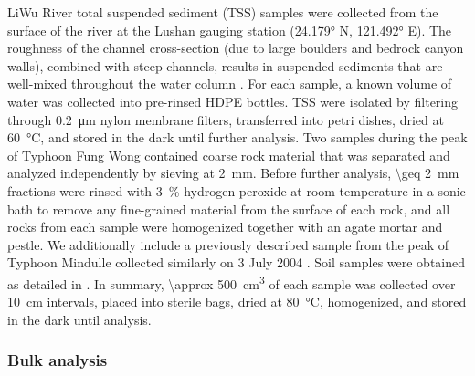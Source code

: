LiWu River total suspended sediment (TSS) samples were collected from the surface of the river at the Lushan gauging station (\ang{24.179} N, \ang{121.492} E). The roughness of the channel cross-section (due to large boulders and bedrock canyon walls), combined with steep channels, results in suspended sediments that are well-mixed throughout the water column \citep{Turowski:2008iz}. For each sample, a known volume of water was collected into pre-rinsed HDPE bottles. TSS were isolated by filtering through \SI{0.2}{\micro m} nylon membrane filters, transferred into petri dishes, dried at \SI{60}{\celsius}, and stored in the dark until further analysis. Two samples during the peak of Typhoon Fung Wong contained coarse rock material that was separated and analyzed independently by sieving at \SI{2}{mm}. Before further analysis, \SI{\geq 2}{mm} fractions were rinsed with \SI{3}{\%} hydrogen peroxide at room temperature in a sonic bath to remove any fine-grained material from the surface of each rock, and all rocks from each sample were homogenized together with an agate mortar and pestle. We additionally include a previously described sample from the peak of Typhoon Mindulle collected similarly on 3 July 2004 \citep{Hilton:2008fo,Hilton:2010cg}. Soil samples were obtained as detailed in \citet{Hilton:2013kq}. In summary, \SI{\approx 500}{cm^{3}} of each sample was collected over \SI{10}{cm} intervals, placed into sterile bags, dried at \SI{80}{\celsius}, homogenized, and stored in the dark until analysis.

\subsubsection{Bulk analysis}

